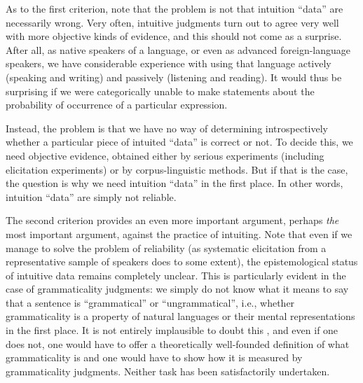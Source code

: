 As to the first criterion, note that the problem is not that intuition  ``data'' are necessarily wrong. Very often, intuitive judgments turn out to agree very well with more objective kinds of evidence, and this should not come as a surprise. After all, as native speakers of a language, or even as advanced foreign\hyp{}language speakers, we have considerable experience with using that language actively (speaking and writing) and passively (listening and reading). It would thus be surprising if we were categorically unable to make statements about the probability  of occurrence of a particular expression.

Instead, the problem is that we have no way of determining introspectively  whether a particular piece of intuited  ``data'' is correct or not. To decide this, we need objective evidence, obtained either by serious experiments  (including elicitation  experiments) or by corpus\hyp{}linguistic methods. But if that is the case, the question is why we need intuition  ``data'' in the first place. In other words, intuition ``data'' are simply not  reliable.

The second criterion provides an even more important argument, perhaps \emph{the} most important argument, against the practice of intuiting.  Note that even if we manage to solve the problem of reliability  (as systematic elicitation  from a representative  sample  of speakers does to some extent), the epistemological  status of intuitive data remains completely unclear. This is particularly evident in the case of grammaticality  judgments: we simply do not know what it means to say that a sentence is ``grammatical'' or ``ungrammatical'',  i.e., whether grammaticality is a property of natural languages or their mental representations in the first place. It is not entirely implausible to doubt this \citep[cf.][]{sampson_evidence_1987}, and even if one does not, one would have to offer a theoretically well\hyp{}founded definition of what grammaticality  is and one would have to show how it is measured by grammaticality judgments. Neither task has been satisfactorily undertaken.

